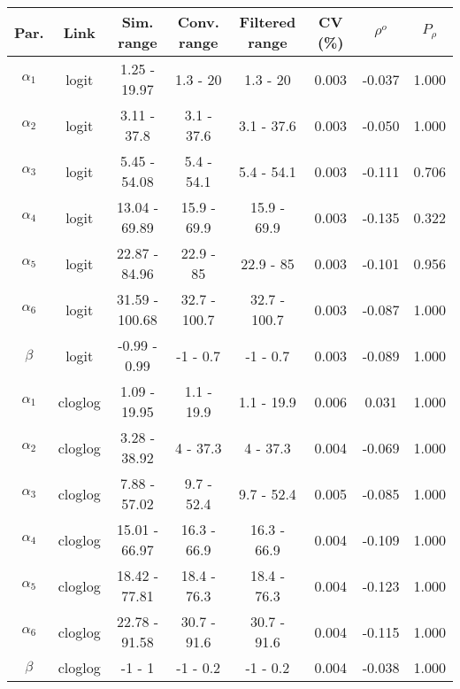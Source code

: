 
\begin{tabular}{cccccccc}
\toprule
Par. & Link & Sim. range & Conv. range & Filtered range & CV (\%) & $\rho^{o}$ & $P_\rho$\\
\midrule
$\alpha_1$ & logit & 1.25 - 19.97 & 1.3 - 20 & 1.3 - 20 & 0.003 & -0.037 & 1.000\\
$\alpha_2$ & logit & 3.11 - 37.8 & 3.1 - 37.6 & 3.1 - 37.6 & 0.003 & -0.050 & 1.000\\
$\alpha_3$ & logit & 5.45 - 54.08 & 5.4 - 54.1 & 5.4 - 54.1 & 0.003 & -0.111 & 0.706\\
$\alpha_4$ & logit & 13.04 - 69.89 & 15.9 - 69.9 & 15.9 - 69.9 & 0.003 & -0.135 & 0.322\\
$\alpha_5$ & logit & 22.87 - 84.96 & 22.9 - 85 & 22.9 - 85 & 0.003 & -0.101 & 0.956\\
$\alpha_6$ & logit & 31.59 - 100.68 & 32.7 - 100.7 & 32.7 - 100.7 & 0.003 & -0.087 & 1.000\\
$\beta$ & logit & -0.99 - 0.99 & -1 - 0.7 & -1 - 0.7 & 0.003 & -0.089 & 1.000\\
\addlinespace
$\alpha_1$ & cloglog & 1.09 - 19.95 & 1.1 - 19.9 & 1.1 - 19.9 & 0.006 & 0.031 & 1.000\\
$\alpha_2$ & cloglog & 3.28 - 38.92 & 4 - 37.3 & 4 - 37.3 & 0.004 & -0.069 & 1.000\\
$\alpha_3$ & cloglog & 7.88 - 57.02 & 9.7 - 52.4 & 9.7 - 52.4 & 0.005 & -0.085 & 1.000\\
$\alpha_4$ & cloglog & 15.01 - 66.97 & 16.3 - 66.9 & 16.3 - 66.9 & 0.004 & -0.109 & 1.000\\
$\alpha_5$ & cloglog & 18.42 - 77.81 & 18.4 - 76.3 & 18.4 - 76.3 & 0.004 & -0.123 & 1.000\\
$\alpha_6$ & cloglog & 22.78 - 91.58 & 30.7 - 91.6 & 30.7 - 91.6 & 0.004 & -0.115 & 1.000\\
$\beta$ & cloglog & -1 - 1 & -1 - 0.2 & -1 - 0.2 & 0.004 & -0.038 & 1.000\\
\bottomrule
\end{tabular}